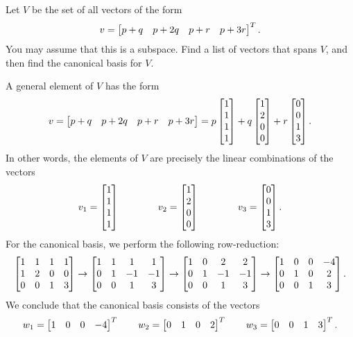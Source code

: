\documentclass[a4paper]{amsart}
\renewenvironment{solution}{\SolutionInline}{\endSolutionInline}
\begin{document}
\begin{exercise}\label{ex-span-canonical-i}
 Let $V$ be the set of all vectors of the form 
 \[ v = \left[\begin{matrix} p+q & p+2q & p+r & p+3r \end{matrix}\right]^T. \]
 You may assume that this is a subspace.  Find a list of vectors that
 spans $V$, and then find the canonical basis for $V$.
\end{exercise}
\begin{solution}
 A general element of $V$ has the form
 \[ v = 
     \left[\begin{matrix} p+q & p+2q & p+r & p+3r \end{matrix}\right] = 
     p \left[\begin{matrix} 1\\1\\1\\1\end{matrix}\right] + 
     q \left[\begin{matrix} 1\\2\\0\\0\end{matrix}\right] +
     r \left[\begin{matrix} 0\\0\\1\\3\end{matrix}\right].
 \]
 In other words, the elements of $V$ are precisely the linear
 combinations of the vectors
 \[ v_1 = \left[\begin{matrix} 1 \\ 1 \\ 1 \\ 1 \end{matrix}\right] \hspace{4em} 
    v_2 = \left[\begin{matrix} 1 \\ 2 \\ 0 \\ 0 \end{matrix}\right] \hspace{4em} 
    v_3 = \left[\begin{matrix} 0 \\ 0 \\ 1 \\ 3 \end{matrix}\right].
 \]
 For the canonical basis, we perform the following row-reduction:
 \[ 
  \left[\begin{matrix} 
   1 & 1 & 1 & 1 \\
   1 & 2 & 0 & 0 \\
   0 & 0 & 1 & 3
  \end{matrix}\right]
  \to 
  \left[\begin{matrix} 
   1 & 1 & 1 & 1 \\
   0 & 1 &-1 &-1 \\
   0 & 0 & 1 & 3
  \end{matrix}\right]
  \to 
  \left[\begin{matrix} 
   1 & 0 & 2 & 2 \\
   0 & 1 &-1 &-1 \\
   0 & 0 & 1 & 3
  \end{matrix}\right]
  \to 
  \left[\begin{matrix} 
   1 & 0 & 0 &-4 \\
   0 & 1 & 0 & 2 \\
   0 & 0 & 1 & 3
  \end{matrix}\right].
 \]
 We conclude that the canonical basis consists of the vectors
 \[ 
   w_1 = \left[\begin{matrix} 1 & 0 & 0 & -4 \end{matrix}\right]^T \hspace{2em}
   w_2 = \left[\begin{matrix} 0 & 1 & 0 &  2 \end{matrix}\right]^T \hspace{2em}
   w_3 = \left[\begin{matrix} 0 & 0 & 1 &  3 \end{matrix}\right]^T.
 \]
\end{solution}
\end{document}
